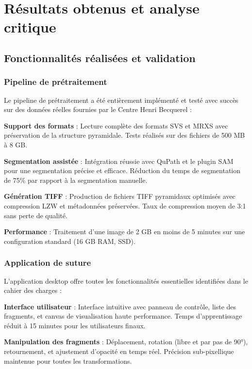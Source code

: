 \documentclass[12pt,a4paper]{report}
\begin{document}
\section{Résultats obtenus et analyse critique}

\clearpage

\subsection{Fonctionnalités réalisées et validation}

\subsubsection{Pipeline de prétraitement}

Le pipeline de prétraitement a été entièrement implémenté et testé avec succès sur des données réelles fournies par le Centre Henri Becquerel :

\textbf{Support des formats} : Lecture complète des formats SVS et MRXS avec préservation de la structure pyramidale. Tests réalisés sur des fichiers de 500 MB à 8 GB.

\textbf{Segmentation assistée} : Intégration réussie avec QuPath et le plugin SAM pour une segmentation précise et efficace. Réduction du temps de segmentation de 75\% par rapport à la segmentation manuelle.

\textbf{Génération TIFF} : Production de fichiers TIFF pyramidaux optimisés avec compression LZW et métadonnées préservées. Taux de compression moyen de 3:1 sans perte de qualité.

\textbf{Performance} : Traitement d'une image de 2 GB en moins de 5 minutes sur une configuration standard (16 GB RAM, SSD).

\subsubsection{Application de suture}

L'application desktop offre toutes les fonctionnalités essentielles identifiées dans le cahier des charges :

\textbf{Interface utilisateur} : Interface intuitive avec panneau de contrôle, liste des fragments, et canvas de visualisation haute performance. Temps d'apprentissage réduit à 15 minutes pour les utilisateurs finaux.

\textbf{Manipulation des fragments} : Déplacement, rotation (libre et par pas de 90°), retournement, et ajustement d'opacité en temps réel. Précision sub-pixellique maintenue pour toutes les transformations.
\end{document}
